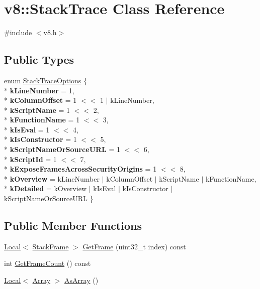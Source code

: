 \hypertarget{classv8_1_1_stack_trace}{}\section{v8\+:\+:Stack\+Trace Class Reference}
\label{classv8_1_1_stack_trace}


{\ttfamily \#include $<$v8.\+h$>$}

\subsection*{Public Types}
\begin{DoxyCompactItemize}
\item 
enum \hyperlink{classv8_1_1_stack_trace_a9704e4a37949eb8eb8ccddbddf161492}{Stack\+Trace\+Options} \{ \\*
{\bfseries k\+Line\+Number} = 1, 
\\*
{\bfseries k\+Column\+Offset} = 1 $<$$<$ 1 $\vert$ k\+Line\+Number, 
\\*
{\bfseries k\+Script\+Name} = 1 $<$$<$ 2, 
\\*
{\bfseries k\+Function\+Name} = 1 $<$$<$ 3, 
\\*
{\bfseries k\+Is\+Eval} = 1 $<$$<$ 4, 
\\*
{\bfseries k\+Is\+Constructor} = 1 $<$$<$ 5, 
\\*
{\bfseries k\+Script\+Name\+Or\+Source\+U\+RL} = 1 $<$$<$ 6, 
\\*
{\bfseries k\+Script\+Id} = 1 $<$$<$ 7, 
\\*
{\bfseries k\+Expose\+Frames\+Across\+Security\+Origins} = 1 $<$$<$ 8, 
\\*
{\bfseries k\+Overview} = k\+Line\+Number $\vert$ k\+Column\+Offset $\vert$ k\+Script\+Name $\vert$ k\+Function\+Name, 
\\*
{\bfseries k\+Detailed} = k\+Overview $\vert$ k\+Is\+Eval $\vert$ k\+Is\+Constructor $\vert$ k\+Script\+Name\+Or\+Source\+U\+RL
 \}
\end{DoxyCompactItemize}
\subsection*{Public Member Functions}
\begin{DoxyCompactItemize}
\item 
\hyperlink{classv8_1_1_local}{Local}$<$ \hyperlink{classv8_1_1_stack_frame}{Stack\+Frame} $>$ \hyperlink{classv8_1_1_stack_trace_a297099d02053ec3239751682d2d130a0}{Get\+Frame} (uint32\+\_\+t index) const 
\item 
int \hyperlink{classv8_1_1_stack_trace_aafafebce6c034f1f6f4a870e8f52431e}{Get\+Frame\+Count} () const 
\item 
\hyperlink{classv8_1_1_local}{Local}$<$ \hyperlink{classv8_1_1_array}{Array} $>$ \hyperlink{classv8_1_1_stack_trace_ada51166294a558d0fe9e1715817c5eb3}{As\+Array} ()
\end{DoxyCompactItemize}
